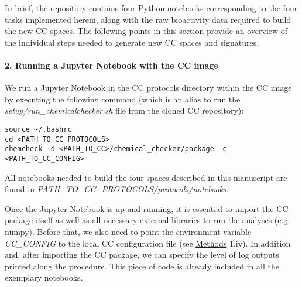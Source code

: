 In brief, the repository contains four Python notebooks corresponding to the four tasks implemented herein, along with the raw bioactivity data required to build the new CC spaces. The following points in this section provide an overview of the individual steps needed to generate new CC spaces and signatures.




\paragraph{2. Running a Jupyter Notebook with the CC image} \leavevmode

We run a Jupyter Notebook in the CC protocols directory within the CC image by executing the following command (which is an alias to run the \textit{setup/run\_chemicalchecker.sh} file from the cloned CC repository): \\

\begin{lstlisting}
source ~/.bashrc
cd <PATH_TO_CC_PROTOCOLS>
chemcheck -d <PATH_TO_CC>/chemical_checker/package -c <PATH_TO_CC_CONFIG>
\end{lstlisting}

All notebooks needed to build the four spaces described in this manuscript are found in \textit{PATH\_TO\_CC\_PROTOCOLS/protocols/notebooks}.

Once the Jupyter Notebook is up and running, it is essential to import the CC package itself as well as all necessary external libraries to run the analyses (e.g. numpy). Before that, we also need to point the environment variable \textit{CC\_CONFIG} to the local CC configuration file (see \hyperref[Procotols_Methods]{Methods} 1.iv). In addition and, after importing the CC package, we can specify the level of log outputs printed along the procedure. This piece of code is already included in all the exemplary notebooks. \\

